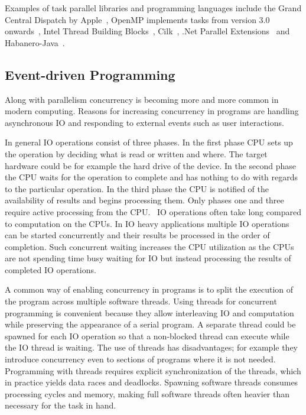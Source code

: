 Examples of task parallel libraries and programming languages include the Grand Central Dispatch by Apple~\cite{sakamoto2012grand}, OpenMP implements tasks from version 3.0 onwards~\cite{ayguade2009design}, Intel Thread Building Blocks~\cite{pheatt2008intel}, Cilk~\cite{blumofe1996cilk}, .Net Parallel Extensions~\cite{leijen2009design} and Habanero-Java~\cite{barik2009habanero}.

\subsection{Event-driven Programming}
\label{subsec:event-driven-programming}
Along with parallelism concurrency is becoming more and more common in modern computing. Reasons for increasing concurrency in programs are handling asynchronous IO and responding to external events such as user interactions.

In general IO operations consist of three phases. In the first phase CPU sets up the operation by deciding what is read or written and where. The target hardware could be for example the hard drive of the device. In the second phase the CPU waits for the operation to complete and has nothing to do with regards to the particular operation. In the third phase the CPU is notified of the availability of results and begins processing them. Only phases one and three require active processing from the CPU.~\cite{friesen2015asynchronous} IO operations often take long compared to computation on the CPUs. In IO heavy applications multiple IO operations can be started concurrently and their results be processed in the order of completion. Such concurrent waiting increases the CPU utilization as the CPUs are not spending time busy waiting for IO but instead processing the results of completed IO operations.~\cite{dabek2002event}

A common way of enabling concurrency in programs is to split the execution of the program across multiple software threads. Using threads for concurrent programming is convenient because they allow interleaving IO and computation while preserving the appearance of a serial program. A separate thread could be spawned for each IO operation so that a non-blocked thread can execute while the IO thread is waiting. The use of threads has disadvantages; for example they introduce concurrency even to sections of programs where it is not needed. Programming with threads requires explicit synchronization of the threads, which in practice yields data races and deadlocks. Spawning software threads consumes processing cycles and memory, making full software threads often heavier than necessary for the task in hand.~\cite{dabek2002event, lee2006problem}

